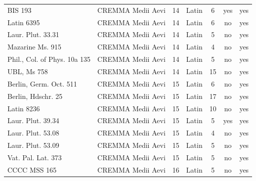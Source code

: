 \begin{table}[htbp]
\begin{tabular}{lcccccc}
    BIS 193 & CREMMA Medii Aevi & 14 & Latin & 6 & yes & yes \\
    Latin 6395 & CREMMA Medii Aevi & 14 & Latin & 6 & no & yes \\
    Laur. Plut. 33.31 & CREMMA Medii Aevi & 14 & Latin & 5 & no & yes \\
    Mazarine Ms. 915 & CREMMA Medii Aevi & 14 & Latin & 4 & no & yes \\
    Phil., Col. of Phys. 10a 135 & CREMMA Medii Aevi & 14 & Latin & 5 & no & yes \\
    UBL, Ms 758 & CREMMA Medii Aevi & 14 & Latin & 15 & no & yes \\
    Berlin, Germ. Oct. 511 & CREMMA Medii Aevi & 15 & Latin & 6 & no & yes \\
    Berlin, Hdschr. 25 & CREMMA Medii Aevi & 15 & Latin & 17 & no & yes \\
    Latin 8236 & CREMMA Medii Aevi & 15 & Latin & 10 & no & yes \\
    Laur. Plut. 39.34 & CREMMA Medii Aevi & 15 & Latin & 5 & yes & yes \\
    Laur. Plut. 53.08 & CREMMA Medii Aevi & 15 & Latin & 4 & no & yes \\
    Laur. Plut. 53.09 & CREMMA Medii Aevi & 15 & Latin & 5 & no & yes \\
    Vat. Pal. Lat. 373 & CREMMA Medii Aevi & 15 & Latin & 5 & no & yes \\
    CCCC MSS 165 & CREMMA Medii Aevi & 16 & Latin & 5 & no & yes \\
    \bottomrule
  \end{tabular}
\end{table}
